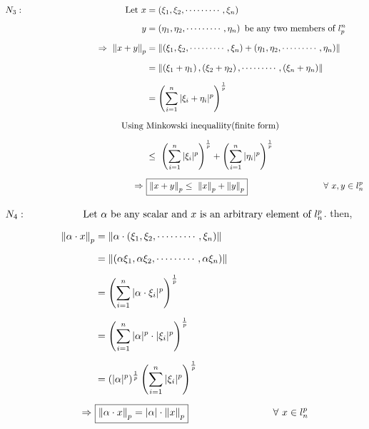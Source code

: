 \documentclass[a4paper,12pt]{article}
\begin{document}
    \pagebreak

    \vspace*{0.5cm}

    \begin{equation*}
        \begin{split}
            N_3:\hspace*{4cm} \mbox{Let}\ x & = \left(\xi_1, \xi_2, \cdots \cdots \cdots, \xi_n\right)\\[2mm]
            y & = \left(\eta_1,\eta_2, \cdots \cdots \cdots , \eta_n\right)\ \mbox{be any two members of}\ l^n_{p}\\[2mm]
            \Rightarrow\ \norm{x + y}_p & = \norm{\left(\xi_1 ,\xi_2, \cdots \cdots \cdots, \xi_n\right) + \left(\eta_1,\eta_2, \cdots \cdots \cdots, \eta_n\right)}\\[2mm]
            & = \norm{\left(\xi_1 + \eta_1\right),\left(\xi_2 + \eta_2\right), \cdots \cdots \cdots, \left(\xi_n + \eta_n\right)}\\[2mm]
            & = \left(\sum_{i=1}^{n}|\xi_i + \eta_i|^p\right)^\frac{1}{p}\\[2mm]
            \mbox{Using}\  & \mbox{Minkowski inequaliity(finite form)}\\[2mm]
            & \leq\ \left(\sum_{i=1}^{n}|\xi_i|^p\right)^\frac{1}{p} + \left(\sum_{i=1}^{n}|\eta_i|^p\right)^\frac{1}{p}\\[2mm]
            \Rightarrow\ & \boxed{\norm{x + y}_p  \leq\  \norm{x}_p + \norm{y}_p} \hspace*{3cm} \forall\ x,y\in l^p_{n}
        \end{split}
    \end{equation*}

    \vspace*{0.5cm}

    $N_4:\hspace*{2cm} \mbox{Let}\ \alpha\ \mbox{be any scalar and}\ x\ \mbox{is an arbitrary element of}\ l^p_{n}$. then,

    \begin{equation*}
        \begin{split}
            \norm{\alpha \cdot x}_p & = \norm{\alpha \cdot \left(\xi_1,\xi_2, \cdots \cdots \cdots, \xi_n\right)}\\[2mm]
            & = \norm{\left(\alpha \xi_1, \alpha \xi_2, \cdots \cdots \cdots, \alpha \xi_n\right)}\\[2mm]
            & = \left(\sum_{i=1}^{n} |\alpha \cdot \xi_i|^p\right)^\frac{1}{p}\\[2mm]
            & = \left(\sum_{i=1}^{n} |\alpha|^p \cdot |\xi_i|^p\right)^\frac{1}{p}\\[2mm]
            & = \left(|\alpha|^p\right)^\frac{1}{p} \left(\sum_{i=1}^{n}  |\xi_i|^p\right)^\frac{1}{p}\\[2mm]
            \Rightarrow\ & \boxed{\norm{\alpha \cdot x}_p = |\alpha| \cdot \norm{x}_p} \hspace*{3cm} \forall\ x\in l^p_{n}
        \end{split}
    \end{equation*}
    \vspace*{1cm}
\end{document}
